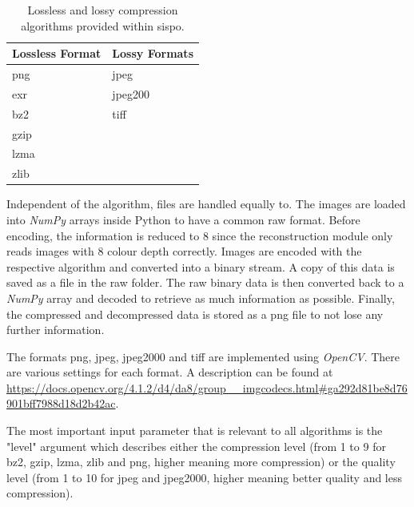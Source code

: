 \begin{table}[htpb]
\caption{Lossless and lossy compression algorithms provided within \gls{sispo}.}
\label{tab:compression_format}
\begin{tabular}{l|l}
\textbf{Lossless Format} & \textbf{Lossy Formats} \\ \hline
png               & jpeg           \\
exr               & jpeg200        \\
bz2               & tiff           \\
gzip              &                \\
lzma              &                \\
zlib              &               
\end{tabular}
\end{table}

Independent of the algorithm, files are handled equally to. The images are loaded into \textit{NumPy} arrays inside Python to have a common raw format. Before encoding, the information is reduced to \SI{8}{\bit} since the reconstruction module only reads images with \SI{8}{\bit} colour depth correctly. Images are encoded with the respective algorithm and converted into a binary stream. A copy of this data is saved as a file in the raw folder. The raw binary data is then converted back to a \textit{NumPy} array and decoded to retrieve as much information as possible. Finally, the compressed and decompressed data is stored as a png file to not lose any further information.

The formats png, jpeg, jpeg2000 and tiff are implemented using \textit{OpenCV}. There are various settings for each format. A description can be found at \url{https://docs.opencv.org/4.1.2/d4/da8/group__imgcodecs.html#ga292d81be8d76901bff7988d18d2b42ac}.

The most important input parameter that is relevant to all algorithms is the "level" argument which describes either the compression level (from 1 to 9 for bz2, gzip, lzma, zlib and png, higher meaning more compression) or the quality level (from 1 to 10 for jpeg and jpeg2000, higher meaning better quality and less compression).

